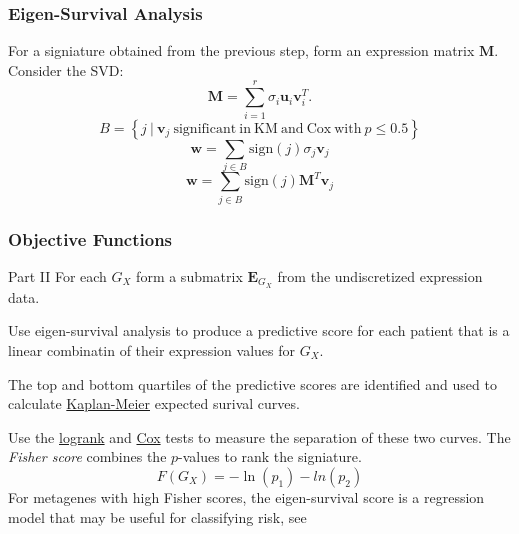 \documentclass[
	11pt, %
]{beamer}
\begin{document}
\begin{frame}
    \frametitle{Eigen-Survival Analysis}

    For a signiature obtained from the previous step, form an expression matrix $\mathbf{M}$. Consider the SVD:
    \begin{equation*}
        \mathbf{M} = \sum_{i=1}^{r}\sigma_i \mathbf{u}_i \mathbf{v}_i^T.
    \end{equation*}
    \pause
    \begin{equation*}
        B = \left\{ j\ |\ \mathbf{v}_j \mathrm{\ significant\ in\ KM\ and\ Cox\ with\ } p \leq 0.5 \right\}
    \end{equation*}
    \pause
    \begin{equation*}
        \mathbf{w} = \sum_{j \in B}\mathrm{sign}(j)\sigma_j \mathbf{v}_j
    \end{equation*}
    \pause
    \begin{equation*}
        \mathbf{w} = \sum_{j \in B}\mathrm{sign}(j)\mathbf{M}^{T} \mathbf{v}_j
    \end{equation*}
\end{frame}

\begin{frame}
    \frametitle{Objective Functions}
    \begin{block}{Part II}
        For each $G_X$ form a submatrix $\mathbf{E}_{G_X}$ from the undiscretized expression data.
        \smallskip
        \pause

        Use eigen-survival analysis to produce a predictive score for each patient that is a linear combinatin of their expression values for $G_X$.
        \smallskip
        \pause

        The top and bottom quartiles of the predictive scores are identified and used to calculate \href{https://www.mygreatlearning.com/blog/kaplan-meier-curve-explained}{Kaplan-Meier} expected surival curves.
        \smallskip
        \pause

        Use the \href{https://en.wikipedia.org/wiki/Logrank_test}{logrank} and \href{https://encyclopediaofmath.org/wiki/Cox_regression_model}{Cox} tests to measure the separation of these two curves. The \emph{Fisher score} combines the $p$-values to rank the signiature.
        \begin{equation*}
            F(G_X) = -\ln(p_1)-ln(p_2)
        \end{equation*}
        \pause
        For metagenes with high Fisher scores, the eigen-survival score is a regression model that may be useful for classifying risk, see \cite{p3}
    \end{block}
\end{frame}
\end{document}
